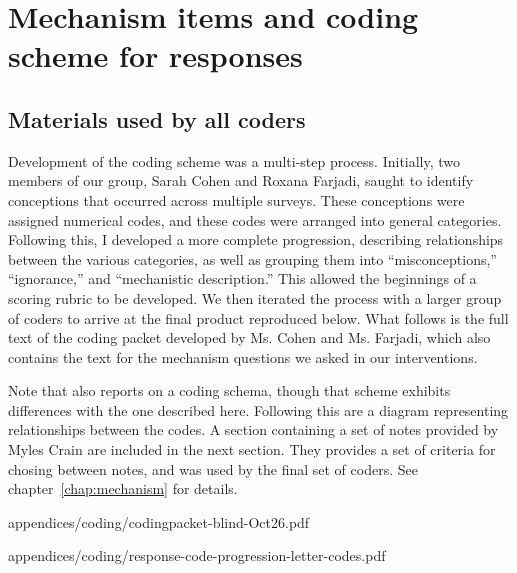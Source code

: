 \chapter{Mechanism items and coding scheme for responses}
\label{app:coding}

\section{Materials used by all coders}
\label{sec:materials}

Development of the coding scheme was a multi-step process. Initially, two
members of our group, Sarah Cohen and Roxana Farjadi, saught to identify
conceptions that occurred across multiple surveys. These conceptions were
assigned numerical codes, and these codes were arranged into general categories.
Following this, I developed a more complete progression, describing
relationships between the various categories, as well as grouping them into
“misconceptions,” “ignorance,” and “mechanistic description.” This allowed the
beginnings of a scoring rubric to be developed. We then iterated the process
with a larger group of coders to arrive at the final product reproduced below.
What follows is the full text of the coding packet developed by Ms. Cohen and
Ms. Farjadi, which also contains the text for the mechanism questions we
asked in our interventions. 

Note that \textcite{cohen_san_2012_f} also reports on a coding schema, though
that scheme exhibits differences with the one described here. Following this are
a diagram representing relationships between the codes. A section containing a
set of notes provided by Myles Crain are included in the next section. They
provides a set of criteria for chosing between notes, and was used by the final
set of coders. See chapter~\ref{chap:mechanism} for details.

           {appendices/coding/codingpacket-blind-Oct26.pdf}


           {appendices/coding/response-code-progression-letter-codes.pdf}


